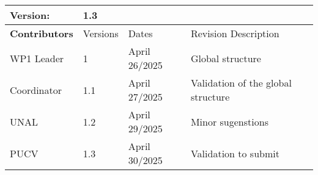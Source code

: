 \begin{tabular}{ >{\raggedright\arraybackslash}p{3cm}| p{2cm} p{4cm} p{6cm} }
    \toprule
    \textbf{Version}: & \multicolumn{3}{l}{ 1.3} \\ \midrule
    \textbf{Contributors}  & Versions    & Dates       & Revision Description \\ \midrule
    WP1 Leader  & 1    & April 26/2025  & Global structure  \\ 
    Coordinator  & 1.1    & April 27/2025  & Validation of the global structure  \\ 
    UNAL  & 1.2   & April 29/2025  & Minor sugenstions  \\ 
    PUCV  & 1.3   & April 30/2025  & Validation to submit  \\ 
    \bottomrule
\end{tabular}  
